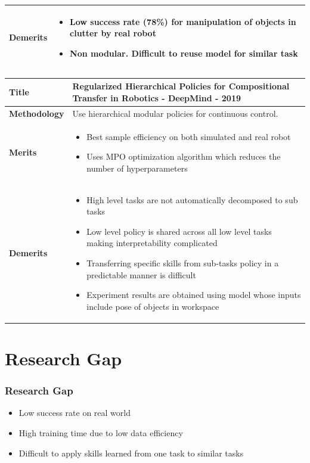 \documentclass{beamer}
\begin{document}
\begin{frame}[allowframebreaks]
\begin{tabular}{m{2.25cm} | m{9cm}}
			\textbf{Demerits} &
			\begin{itemize}
				\item Low success rate (78\%) for manipulation of objects in clutter by real robot
				\item Non modular. Difficult to reuse model for similar task
			\end{itemize}\\
			\hline
			
		\end{tabular}
	
		\begin{tabular}{m{2.25cm} | m{9cm}}
			\hline
			
			\textbf{Title} &
			Regularized Hierarchical Policies for Compositional Transfer in Robotics \cite{rhpo} - DeepMind - 2019\\
			\hline
			
			\textbf{Methodology} &
			Use hierarchical modular policies for continuous control. \\
			\hline
			
			\textbf{Merits} &
			\begin{itemize}
				\item Best sample efficiency on both simulated and real robot
				\item Uses MPO optimization algorithm which reduces the number of hyperparameters
			\end{itemize} \\
			\hline
			
			\textbf{Demerits} &
			\begin{itemize}
				\item High level tasks are not automatically decomposed to sub tasks
				\item Low level policy is shared across all low level tasks making interpretability complicated
				\item Transferring specific skills from sub-tasks policy in a predictable manner is difficult
				\item Experiment results are obtained using model whose inputs include pose of objects in workspace
			\end{itemize}\\
			\hline
			
		\end{tabular}
	\end{frame}
	
	\section{Research Gap}
	\begin{frame}
		\frametitle{Research Gap}
		\begin{itemize}
			\item Low success rate on real world
			\item High training time due to low data efficiency
			\item Difficult to apply skills learned from one task to similar tasks
		\end{itemize}
	\end{frame}
\end{document}
